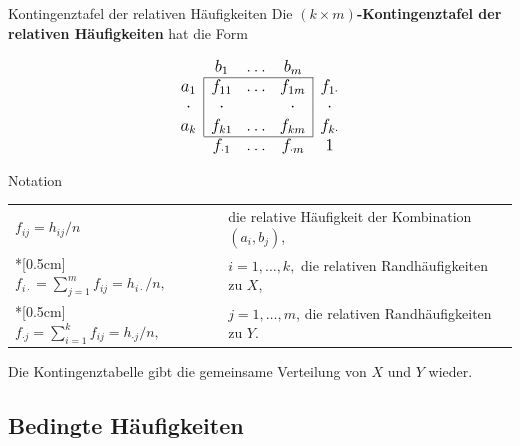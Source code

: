 \documentclass[
  10pt,
  ignorenonframetext,
]{beamer}
\begin{document}
\begin{frame}{Kontingenztafel der relativen Häufigkeiten}
\label{kontingenztafel-der-relativen-huxe4ufigkeiten}
Die \textbf{\((k\times m)\)-Kontingenztafel der relativen Häufigkeiten}
hat die Form

\vspace*{1cm}

\begin{displaymath}
\begin{large}
\begin{array}{c|ccc|c}
\multicolumn{1}{c}{}
& \multicolumn{1}{c}{b_1}
  & \dots
    & \multicolumn{1}{c}{b_m}\\\cline{2-4}
a_1 & f_{11} & \dots & f_{1m} & f_{1\cdot}\\
\cdot & \cdot & & \cdot & \cdot \\
a_k & f_{k1} & \dots & f_{km} & f_{k\cdot}\\\cline{2-4}
\multicolumn{1}{c}{}
  & \multicolumn{1}{c}{f_{\cdot 1} }
    & \dots
      & \multicolumn{1}{c}{f_{\cdot m} }
        & \multicolumn{1}{c}{1}
\end{array}
\end{large}
\end{displaymath}
\end{frame}

\begin{frame}{Notation}
\label{notation-1}
\begin{center}
\begin{tabular}{lp{9cm}}
$f_{ij} = h_{ij}/n$ & die relative Häufigkeit der Kombination $(a_i,b_j)$, \\*[0.5cm]
$f_{i\cdot}=\sum\limits_{j=1}^m f_{ij} = h_{i\cdot}/n,$
                 & $i=1,\dots,k,$ die relativen Randhäufigkeiten zu $X$,\\*[0.5cm]
$f_{\cdot j}=\sum\limits_{i=1}^k f_{ij} = h_{\cdot j}/n,$
                 & $j=1,\dots,m$, die relativen Randhäufigkeiten zu $Y$.
\end{tabular}
\end{center}

Die Kontingenztabelle gibt die gemeinsame Verteilung von \(X\) und \(Y\)
wieder.
\end{frame}

\subsection{Bedingte Häufigkeiten}\label{bedingte-huxe4ufigkeiten}
\end{document}
